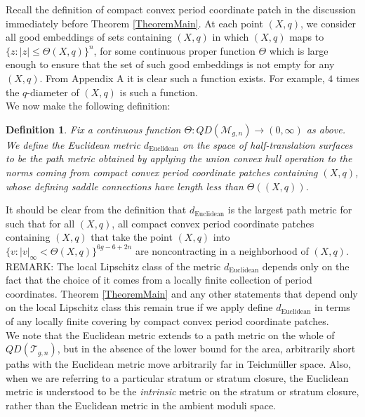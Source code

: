 \documentclass[12pt]{article}
\newtheorem{definition}[theorem]{Definition}
\begin{document}
\noindent Recall the definition of compact convex period coordinate patch in the discussion immediately before Theorem \ref{TheoremMain}. At each point $(X,q)$, we consider all good embeddings of sets containing $(X,q)$ in which $(X,q)$ maps to $\{z: |z| \leq \Theta(X,q)\}^n$, for some continuous proper function $\Theta$ which is large enough to ensure that the set of such good embeddings is not empty for any $(X,q)$. From Appendix A it is clear such a function exists. For example, $4$ times the $q$-diameter of $(X,q)$ is such a function.\\

\noindent We now make the following definition:

\begin{definition}\label{DefineEuclidean}
Fix a continuous function $\Theta: QD(\mathcal{M}_{g,n}) \to (0,\infty)$ as above. We define the \emph{Euclidean metric} $d_\mathrm{Euclidean}$ on the space of half-translation surfaces to be the path metric obtained by applying the union convex hull operation to the norms coming from compact convex period coordinate patches containing $(X,q)$, whose defining saddle connections have length less than $\Theta((X,q))$.
\end{definition}

\noindent It should be clear from the definition that $d_\mathrm{Euclidean}$ is the largest path metric for such that for all $(X,q)$, all compact convex period coordinate patches containing $(X,q)$ that take the point $(X,q)$ into $\{v: |v|_\infty < \Theta(X,q)\}^{6g-6+2n}$ are noncontracting in a neighborhood of $(X,q)$.\\

\noindent REMARK: The local Lipschitz class of the metric $d_\mathrm{Euclidean}$ depends only on the fact that the choice of it comes from a locally finite collection of period coordinates. Theorem \ref{TheoremMain} and any other statements that depend only on the local Lipschitz class this remain true if we apply define $d_\mathrm{Euclidean}$ in terms of any locally finite covering by compact convex period coordinate patches.\\

\noindent We note that the Euclidean metric extends to a path metric on the whole of $QD(\mathcal{T}_{g,n})$, but in the absence of the lower bound for the area, arbitrarily short paths with the Euclidean metric move arbitrarily far in Teichm\"uller space. Also, when we are referring to a particular stratum or stratum closure, the Euclidean metric is understood to be the \emph{intrinsic} metric on the stratum or stratum closure, rather than the Euclidean metric in the ambient moduli space.
\end{document}
